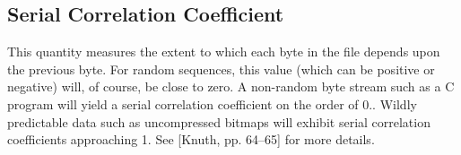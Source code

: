 \subsection*{Serial Correlation Coefficient}

This quantity measures the extent to which each byte in the file depends upon the previous byte. For random sequences, this value (which can be positive or negative) will, of course, be close to zero. A non-\/random byte stream such as a C program will yield a serial correlation coefficient on the order of 0.. Wildly predictable data such as uncompressed bitmaps will exhibit serial correlation coefficients approaching 1. See \mbox{[}Knuth, pp. 64–65\mbox{]} for more details. 